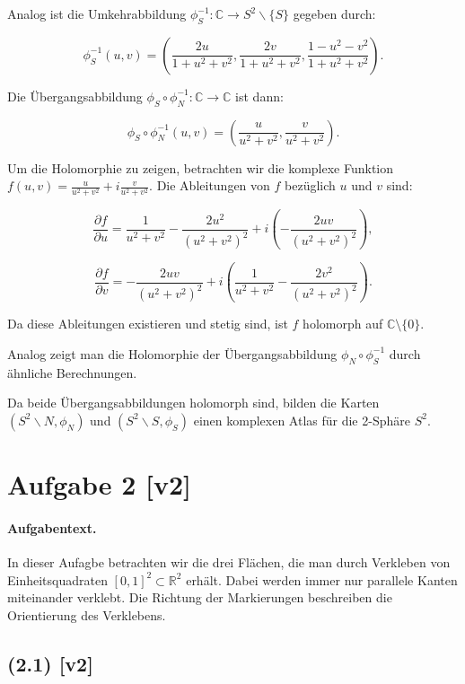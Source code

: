 \documentclass[11pt,a4paper]{article}
\begin{document}
Analog ist die Umkehrabbildung $\phi_S^{-1}: \mathbb{C} \to S^2 \backslash \{S\}$ gegeben durch:

\[
\phi_S^{-1}(u, v) = \left( \frac{2u}{1 + u^2 + v^2}, \frac{2v}{1 + u^2 + v^2}, \frac{1 - u^2 - v^2}{1 + u^2 + v^2} \right).
\]

Die Übergangsabbildung $\phi_S \circ \phi_N^{-1}: \mathbb{C} \to \mathbb{C}$ ist dann:

\[
\phi_S \circ \phi_N^{-1}(u, v) = \left( \frac{u}{u^2 + v^2}, \frac{v}{u^2 + v^2} \right).
\]

Um die Holomorphie zu zeigen, betrachten wir die komplexe Funktion $f(u, v) = \frac{u}{u^2 + v^2} + i\frac{v}{u^2 + v^2}$. Die Ableitungen von $f$ bezüglich $u$ und $v$ sind:

\[
\frac{\partial f}{\partial u} = \frac{1}{u^2 + v^2} - \frac{2u^2}{(u^2 + v^2)^2} + i\left(-\frac{2uv}{(u^2 + v^2)^2}\right),
\]

\[
\frac{\partial f}{\partial v} = -\frac{2uv}{(u^2 + v^2)^2} + i\left(\frac{1}{u^2 + v^2} - \frac{2v^2}{(u^2 + v^2)^2}\right).
\]

Da diese Ableitungen existieren und stetig sind, ist $f$ holomorph auf $\mathbb{C} \setminus \{0\}$.

Analog zeigt man die Holomorphie der Übergangsabbildung $\phi_N \circ \phi_S^{-1}$ durch ähnliche Berechnungen.

Da beide Übergangsabbildungen holomorph sind, bilden die Karten $\left(S^2 \backslash N, \phi_N\right)$ und $\left(S^2 \backslash S, \phi_S\right)$ einen komplexen Atlas für die 2-Sphäre $S^2$.


\section*{Aufgabe 2 [v2]}
\paragraph{Aufgabentext.}
In dieser Aufagbe betrachten wir die drei Flächen, die man durch Verkleben von Einheitsquadraten $[0,1]^2 \subset \mathbb{R}^2$ erhält. Dabei werden immer nur parallele Kanten miteinander verklebt. Die Richtung der Markierungen beschreiben die Orientierung des Verklebens.

\subsection*{(2.1) [v2]}
\end{document}
